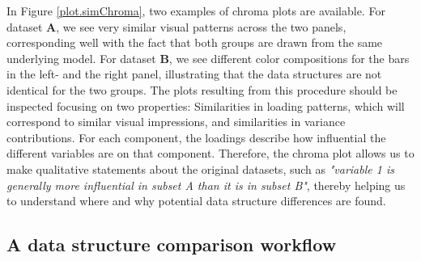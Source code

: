 \documentclass[a4paper,12pt]{article}
\newcommand{\RR}{\mathbb{R}}
\begin{document}
In Figure  \ref{plot.simChroma}, two examples of chroma plots are available. For dataset $\mathbf{A}$, we see very similar visual patterns across the two panels, corresponding well with the fact that both groups are drawn from the same underlying model. For dataset $\mathbf{B}$, we see different color compositions for the bars in the left- and the right panel, illustrating that the data structures are not identical for the two groups. The plots resulting from this procedure should be inspected focusing on two properties: Similarities in loading patterns, which will correspond to similar visual impressions, and similarities in variance contributions. For each component, the loadings describe how influential the different variables are on that component. Therefore, the chroma plot allows us to make qualitative statements about the original datasets, such as \textit{"variable 1 is generally more influential in subset A than it is in subset B"}, thereby helping us to understand where and why potential data structure differences are found.

\subsection*{A data structure comparison workflow}
 
\end{document}
